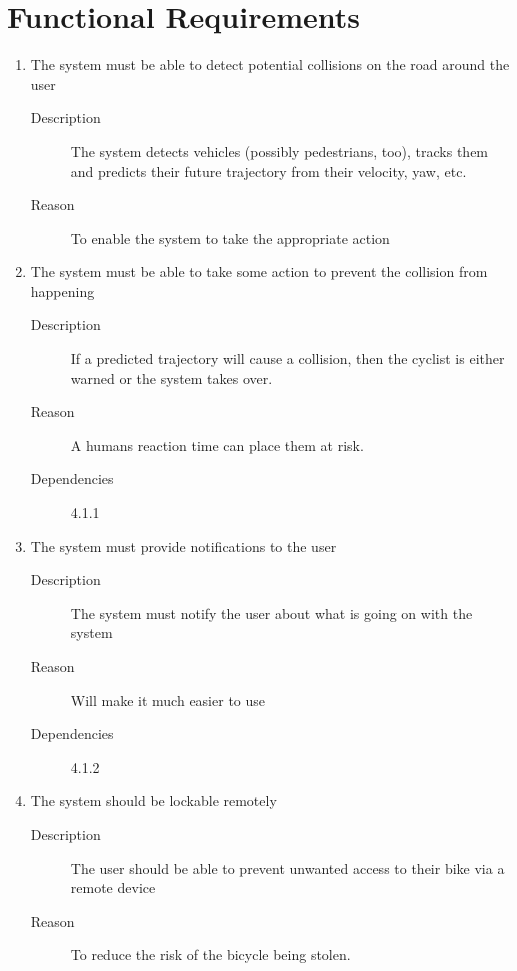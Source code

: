 \documentclass[a4paper]{report}
\begin{document}
\section{Functional Requirements}
\label{sec:func_req}
\begin{enumerate}[label=\ref*{sec:func_req}.\arabic*.,leftmargin=*]


\item The system must be able to detect potential collisions on the road around the user
\begin{description}
\item[Description] The system detects vehicles (possibly pedestrians, too), tracks them and predicts their future trajectory from their velocity, yaw, etc.
\item[Reason] To enable the system to take the appropriate action
\end{description}


\item The system must be able to take some action to prevent the collision from happening
\begin{description}
\item[Description] If a predicted trajectory will cause a collision, then the cyclist is either warned or the system takes over.
\item[Reason] A humans reaction time can place them at risk.
\item[Dependencies] 4.1.1
\end{description}

\item The system must provide notifications to the user
\begin{description}
\item[Description] The system must notify the user about what is going on with the system
\item[Reason] Will make it much easier to use
\item[Dependencies] 4.1.2
\end{description}

\item The system should be lockable remotely
\begin{description}
\item[Description] The user should be able to prevent unwanted access to their bike via a remote device
\item[Reason] To reduce the risk of the bicycle being stolen.
\end{description}


\end{enumerate}
\end{document}
